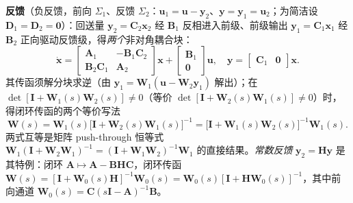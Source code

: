 \noindent \textbf{反馈}（负反馈，前向 $\Sigma_1$、反馈 $\Sigma_2$：$\mathbf{u}_1=\mathbf{u}-\mathbf{y}_2$、$\mathbf{y}=\mathbf{y}_1=\mathbf{u}_2$；为简洁设 $\mathbf{D}_1=\mathbf{D}_2=\mathbf{0}$）：回送量 $\mathbf{y}_2=\mathbf{C}_2\mathbf{x}_2$ 经 $\mathbf{B}_1$ 反相进入前级、前级输出 $\mathbf{y}_1=\mathbf{C}_1\mathbf{x}_1$ 经 $\mathbf{B}_2$ 正向驱动反馈级，得\emph{两个}非对角耦合块：
\begin{equation}
  \dot{\mathbf{x}}=\begin{bmatrix}\mathbf{A}_1&-\mathbf{B}_1\mathbf{C}_2\\\mathbf{B}_2\mathbf{C}_1&\mathbf{A}_2\end{bmatrix}\mathbf{x}+\begin{bmatrix}\mathbf{B}_1\\\mathbf{0}\end{bmatrix}\mathbf{u},\quad
  \mathbf{y}=\begin{bmatrix}\mathbf{C}_1&\mathbf{0}\end{bmatrix}\mathbf{x}.
  \label{eq:ssb-conn-feedback}
\end{equation}
其传函须解分块求逆（由 $\mathbf{y}_1=\mathbf{W}_1(\mathbf{u}-\mathbf{W}_2\mathbf{y}_1)$ 解出）；在 $\det[\mathbf{I}+\mathbf{W}_1(s)\mathbf{W}_2(s)]\neq0$（等价 $\det[\mathbf{I}+\mathbf{W}_2(s)\mathbf{W}_1(s)]\neq0$）时，得闭环传函的两个等价写法
\begin{equation}
  \mathbf{W}(s)=\mathbf{W}_1(s)\big[\mathbf{I}+\mathbf{W}_2(s)\mathbf{W}_1(s)\big]^{-1}=\big[\mathbf{I}+\mathbf{W}_1(s)\mathbf{W}_2(s)\big]^{-1}\mathbf{W}_1(s).
  \label{eq:ssb-conn-feedback-tf}
\end{equation}
两式互等是矩阵 push-through 恒等式 $\mathbf{W}_1(\mathbf{I}+\mathbf{W}_2\mathbf{W}_1)^{-1}=(\mathbf{I}+\mathbf{W}_1\mathbf{W}_2)^{-1}\mathbf{W}_1$ 的直接结果。\emph{常数反馈} $\mathbf{y}_2=\mathbf{H}\mathbf{y}$ 是其特例：闭环 $\mathbf{A}\mapsto\mathbf{A}-\mathbf{B}\mathbf{H}\mathbf{C}$，闭环传函 $\mathbf{W}(s)=[\mathbf{I}+\mathbf{W}_0(s)\mathbf{H}]^{-1}\mathbf{W}_0(s)=\mathbf{W}_0(s)[\mathbf{I}+\mathbf{H}\mathbf{W}_0(s)]^{-1}$，其中前向通道 $\mathbf{W}_0(s)=\mathbf{C}(s\mathbf{I}-\mathbf{A})^{-1}\mathbf{B}$。

